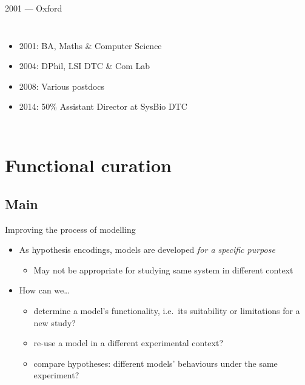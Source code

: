 \documentclass[t,xcolor={usenames,dvipsnames}]{beamer}
\newcommand{\subitem}[1]{\begin{itemize}[<.->]\item #1 \end{itemize}}
\begin{document}
\begin{frame}{2001 --- Oxford}
\begin{columns}[T]
\begin{itemize}
\small
\item 2001: BA, Maths \& Computer Science
\item 2004: DPhil, LSI DTC \& Com Lab
\item 2008: Various postdocs
\item 2014: 50\% Assistant Director at SysBio DTC
\end{itemize}
\end{columns}
\end{frame}

\section{Functional curation}
\subsection*{Main}

\begin{frame}{Improving the process of modelling}
\begin{itemize}[<2>]
\item As hypothesis encodings, models are developed \emph{for a specific purpose}
  \subitem{May not be appropriate for studying same system in different context}
\item How can we\ldots
  \begin{itemize}
  \item determine a model's functionality, i.e.\ its suitability or limitations for a new study? %
  \item re-use a model in a different experimental context?
  \item compare hypotheses: different models' behaviours under the same experiment?
  \end{itemize}
\end{itemize}
\end{frame}
\end{document}
